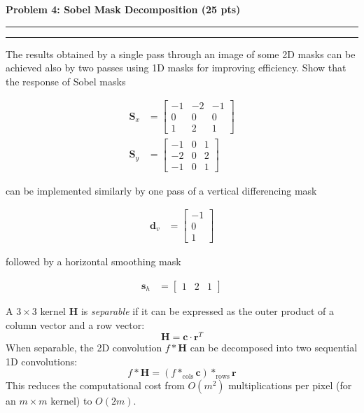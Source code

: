 \documentclass[12pt]{article}
\newcommand{\question}[1]{%
  \clearpage
  \vspace{0.5cm}
  {\noindent\normalsize \textbf{#1}}
  \vspace{0.2cm}
  \hrule
  \vspace{0.1cm}
  \hrule
  \vspace{0.3cm}
}
\begin{document}

\question{Problem 4: Sobel Mask Decomposition (25 pts)}\label{quest:4}

The results obtained by a single pass through an image of some 2D masks can be achieved also
by two passes using 1D masks for improving efficiency. Show that the response of Sobel masks

\begin{align}
\mathbf{S}_x &=
\begin{bmatrix}
-1 & -2 & -1 \\
0 & 0 & 0 \\
1 & 2 & 1
\end{bmatrix} \\[1em]
\mathbf{S}_y &=
\begin{bmatrix}
-1 & 0 & 1 \\
-2 & 0 & 2 \\
-1 & 0 & 1
\end{bmatrix}
\end{align}

can be implemented similarly by one pass of a vertical differencing mask

\begin{align}
\mathbf{d}_v &=
\begin{bmatrix}
-1 \\
0 \\
1
\end{bmatrix}
\end{align}

followed by a horizontal smoothing mask

\begin{align}
\mathbf{s}_h &=
\begin{bmatrix} 1 & 2 & 1 \end{bmatrix}
\end{align}

\vspace{0.4cm}

\begin{stepbox}
A $3 \times 3$ kernel $\mathbf{H}$ is \textit{separable} if it can be expressed as the outer product of a column vector and a row vector:
\[
\mathbf{H} = \mathbf{c} \cdot \mathbf{r}^T
\]
When separable, the 2D convolution $f \ast \mathbf{H}$ can be decomposed into two sequential 1D convolutions:
\[
f \ast \mathbf{H} = (f \ast_{\text{cols}} \mathbf{c}) \ast_{\text{rows}} \mathbf{r}
\]
This reduces the computational cost from $O(m^2)$ multiplications per pixel (for an $m \times m$ kernel) to $O(2m)$.
\end{stepbox}
\end{document}
